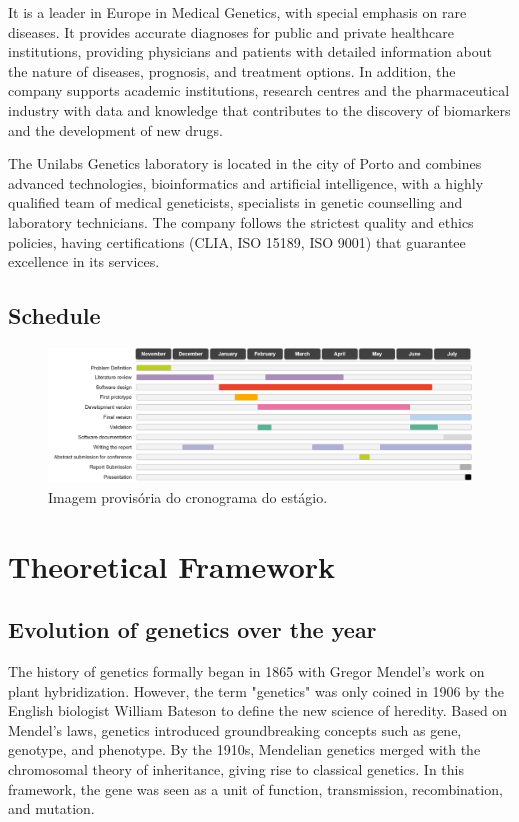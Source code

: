 It is a leader in Europe in Medical Genetics, with special emphasis on rare diseases. It provides accurate diagnoses for public and private healthcare institutions, providing physicians and patients with detailed information about the nature of diseases, prognosis, and treatment options. In addition, the company supports academic institutions, research centres and the pharmaceutical industry with data and knowledge that contributes to the discovery of biomarkers and the development of new drugs. 

The Unilabs Genetics laboratory is located in the city of Porto and combines advanced technologies, bioinformatics and artificial intelligence, with a highly qualified team of medical geneticists, specialists in genetic counselling and laboratory technicians. The company follows the strictest quality and ethics policies, having certifications (CLIA, ISO 15189, ISO 9001) that guarantee excellence in its services. \cite{unilabs_genetica}
\subsection{Schedule}

\begin{figure}[H]
    \centering
    \includegraphics[width=1\textwidth]{figs/schedule.png}
    \caption{Imagem provisória do cronograma do estágio.}
    \label{fig:timeline}
\end{figure}

\section{Theoretical Framework}
\subsection{Evolution of genetics over the year}

The history of genetics formally began in 1865 with Gregor Mendel's work on plant hybridization. However, the term "genetics" was only coined in 1906 by the English biologist William Bateson to define the new science of heredity. Based on Mendel's laws, genetics introduced groundbreaking concepts such as gene, genotype, and phenotype. By the 1910s, Mendelian genetics merged with the chromosomal theory of inheritance, giving rise to classical genetics. In this framework, the gene was seen as a unit of function, transmission, recombination, and mutation. \cite{genetictimeline2}

